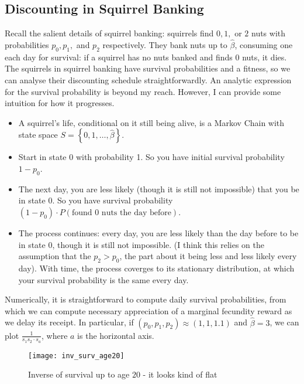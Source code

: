 \subsection{Discounting in Squirrel Banking}
Recall the salient details of squirrel banking: squirrels find $0, 1, $ or $2$ nuts with probabilities $p_0, p_1,$ and $p_2$ respectively. 
They bank nuts up to $\hat\beta$, consuming one each day for survival: if a squirrel has no nuts banked and finds 0 nuts, it dies. 
The squirrels in squirrel banking have survival probabilities and a fitness, so we can analyse their discounting schedule straightforwardly.
An analytic expression for the survival probability is beyond my reach. However, I can provide some intuition for how it progresses.
\begin{itemize}
    \item A squirrel's life, conditional on it still being alive, is a Markov Chain with state space $S = \left\{ 0, 1, \ldots, \hat\beta \right\}$.
    \item Start in state $0$ with probability 1. So you have initial survival probability $1 - p_0$. 
    \item The next day, you are less likely (though it is still not impossible) that you be in state 0. So you have survival probability 
        $(1-p_0)\cdot P(\text{found 0 nuts the day before})$. 
    \item The process continues: every day, you are less likely than the day before to be in state $0$, though it is still not impossible. (I think
        this relies on the assumption that the $p_2 > p_0$, the part about it being less and less likely every day). With time, the process
        coverges to its stationary distribution, at which your survival probability is the same every day. 
\end{itemize}
Numerically, it is straightforward to compute daily survival probabilities, from which we can compute
necessary appreciation of a marginal fecundity reward as we delay its receipt. In particular, if $(p_0, p_1, p_2) \approx (1, 1, 1.1)$ and
$\hat\beta = 3$, we can plot $\frac{1}{s_1s_2\cdot s_a}$, where $a$ is the horizontal axis. 
\begin{figure}[H]
    \centering
    \texttt{[image: inv\_surv\_age20]}
    \caption{Inverse of survival up to age $20$ - it looks kind of flat}
\end{figure}

